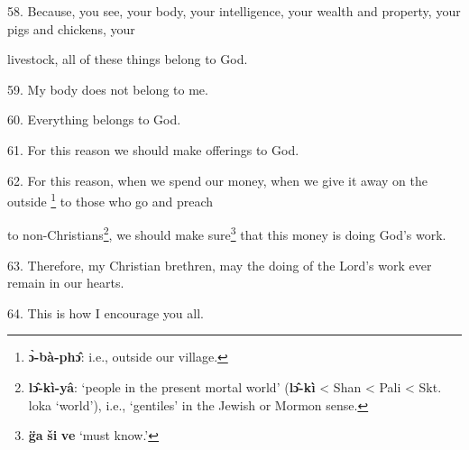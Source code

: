 58. Because, you see, your body, your intelligence, your wealth and property, your
pigs and chickens, your

livestock, all of these things belong to God.

59. My body does not belong to me.

60. Everything belongs to God.

61. For this reason we should make offerings to God.

62. For this reason, when we spend our money, when we give it away on the outside
\footnote{\textbf{ɔ̀-bà-phɔ̂}: i.e., outside our village.} to those who go and preach

to non-Christians\footnote{\textbf{lɔ̂-kì-yâ}: `people in the present mortal world' (\textbf{lɔ̂-kì} < Shan < Pali < Skt. loka `world'), i.e., `gentiles' in the Jewish or Mormon sense.}, we should make sure\footnote{\textbf{g̈a} \textbf{ši} \textbf{ve} `must know.'} that this money is doing God's
work.

63. Therefore, my Christian brethren, may the doing of the Lord's work ever remain
in our hearts.

64. This is how I encourage you all.

